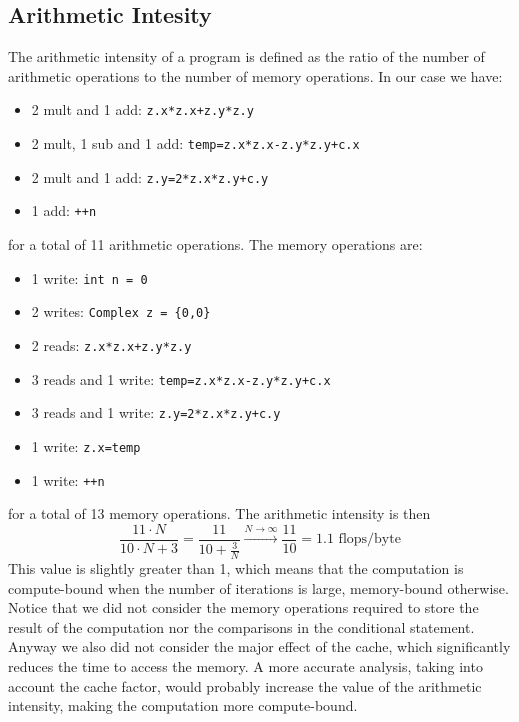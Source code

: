 \subsection{Arithmetic Intesity}
    The arithmetic intensity of a program is defined as the ratio of the
    number of arithmetic operations to the number of memory operations.
    In our case we have:
    \begin{itemize}
        \item 2 mult and 1 add: \texttt{z.x*z.x+z.y*z.y}
        \item 2 mult, 1 sub and 1 add: \texttt{temp=z.x*z.x-z.y*z.y+c.x}
        \item 2 mult and 1 add: \texttt{z.y=2*z.x*z.y+c.y}
        \item 1 add: \texttt{++n}
    \end{itemize}
    for a total of 11 arithmetic operations. The memory operations are:
    \begin{itemize}
        \item 1 write: \texttt{int n = 0} 
        \item 2 writes: \texttt{Complex z = \{0,0\}}
        \item 2 reads: \texttt{z.x*z.x+z.y*z.y}
        \item 3 reads and 1 write: \texttt{temp=z.x*z.x-z.y*z.y+c.x}
        \item 3 reads and 1 write: \texttt{z.y=2*z.x*z.y+c.y}
        \item 1 write: \texttt{z.x=temp}
        \item 1 write: \texttt{++n}
    \end{itemize}
    for a total of 13 memory operations. The arithmetic intensity is then
    $$
        \frac{11 \cdot N}{ 10\cdot N + 3} 
        = \frac{11}{10+\frac{3}{N}} \xrightarrow{N \to \infty} \frac{11}{10}
        = 1.1 \text{ flops/byte}
    $$
    This value is slightly greater than 1, which means that the computation
    is compute-bound when the number of iterations is large, memory-bound
    otherwise. Notice that we did not consider the memory operations
    required to store the result of the computation nor the comparisons in
    the conditional statement. Anyway we also did not consider the major effect
    of the cache, which significantly reduces the time to access the memory.
    A more accurate analysis, taking into account the cache factor, would
    probably increase the value of the arithmetic intensity, making the
    computation more compute-bound.


